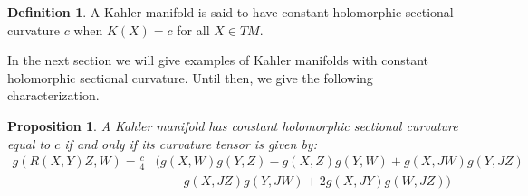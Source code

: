 \documentclass[11pt]{amsart}
\newtheorem{prop}[subsection]{Proposition}
\theoremstyle{definition}
\newtheorem{definition}[subsection]{Definition}
\begin{document}
\begin{definition} A Kahler manifold is said to have constant holomorphic sectional curvature $c$ when $K(X) = c$ for all $X \in TM$.
\end{definition}
%
In the next section we will give examples of Kahler manifolds with constant holomorphic sectional curvature.  Until then, we give the following characterization.
%
\begin{prop} A Kahler manifold has constant holomorphic sectional curvature equal to $c$ if and only if its curvature tensor is given by:
%
\begin{align*}
g( R(X,Y)Z, W ) = \frac{c}{4} & ( g(X,W)g(Y,Z) - g(X,Z)g(Y,W) + g(X,JW)g(Y,JZ) \\
& \quad - g(X,JZ)g(Y,JW) + 2g(X,JY)g(W,JZ) )
\end{align*}
%
\end{prop}
%
\end{document}
